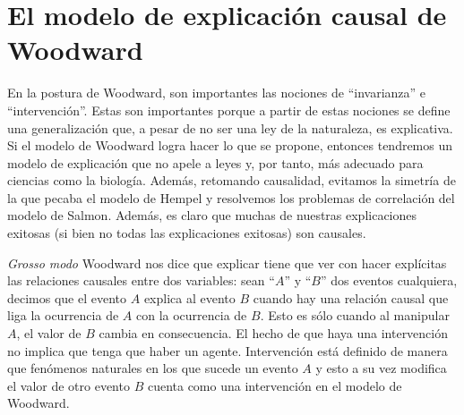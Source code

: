 \section{El modelo de explicación causal de Woodward}

En la postura de Woodward, son importantes las nociones de ``invarianza'' e ``intervención''. Estas son importantes porque a partir de estas nociones se define una generalización que, a pesar de no ser una ley de la naturaleza, es explicativa. Si el modelo de Woodward logra hacer lo que se propone, entonces tendremos un modelo de explicación que no apele a leyes y, por tanto, más adecuado para ciencias como la biología. Además, retomando causalidad, evitamos la simetría de la que pecaba el modelo de Hempel y resolvemos los problemas de correlación del modelo de Salmon. Además, es claro que muchas de nuestras explicaciones exitosas (si bien no todas las explicaciones exitosas) son causales.

\textit{Grosso modo} Woodward nos dice que explicar tiene que ver con hacer explícitas las relaciones causales entre dos variables: sean ``$A$'' y ``$B$'' dos eventos cualquiera, decimos que el evento $A$ explica al evento $B$ cuando hay una relación causal que liga la ocurrencia de $A$ con la ocurrencia de $B$. Esto es sólo cuando al manipular $A$, el valor de $B$ cambia en consecuencia. El hecho de que haya una intervención no implica que tenga que haber un agente. Intervención está definido de manera que fenómenos naturales en los que sucede un evento $A$ y esto a su vez modifica el valor de otro evento $B$ cuenta como una intervención en el modelo de Woodward.

